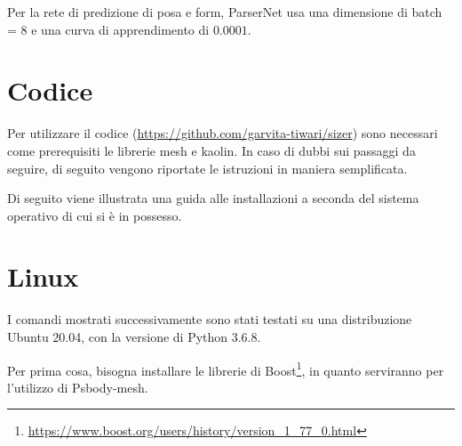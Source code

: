 \medskip

Per la rete di predizione di posa e form, ParserNet usa una dimensione di batch = 8 e una curva di apprendimento di $0.0001$.

\section{Codice}

\medskip

Per utilizzare il codice (\url{https://github.com/garvita-tiwari/sizer}) sono necessari come prerequisiti le librerie mesh e kaolin.
In caso di dubbi sui passaggi da seguire, di seguito vengono riportate le istruzioni in maniera semplificata.

\medskip

Di seguito viene illustrata una guida alle installazioni a seconda del sistema operativo di cui si è in possesso.

\medskip

\section{Linux}

\medskip

I comandi mostrati successivamente sono stati testati su una distribuzione Ubuntu 20.04, con la versione di Python 3.6.8.

\medskip

Per prima cosa, bisogna installare le librerie di Boost\footnote{\url{https://www.boost.org/users/history/version_1_77_0.html}}, in quanto serviranno per l’utilizzo di Psbody-mesh.

\medskip








